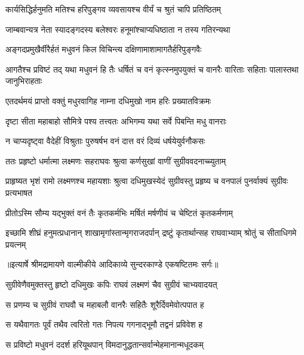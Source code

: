 \twolineshloka
{कार्यसिद्धिर्हनुमति मतिश्च हरिपुङ्गव}
{व्यवसायश्च वीर्यं च श्रुतं चापि प्रतिष्ठितम्} %

\twolineshloka
{जाम्बवान्यत्र नेता स्यादङ्गदस्य बलेश्वरः}
{हनूमांश्चाप्यधिष्ठाता न तस्य गतिरन्यथा} %

\twolineshloka
{अङ्गदप्रमुखैर्वीरैर्हतं मधुवनं किल}
{विचिन्त्य दक्षिणामाशामागतैर्हरिपुङ्गवैः} %

\threelineshloka
{आगतैश्च प्रविष्टं तद् यथा मधुवनं हि तैः}
{धर्षितं च वनं कृत्स्नमुपयुक्तं च वानरैः}
{वारिताः सहिताः पालास्तथा जानुभिराहताः} %

\twolineshloka
{एतदर्थमयं प्राप्तो वक्तुं मधुरवागिह}
{नाम्ना दधिमुखो नाम हरिः प्रख्यातविक्रमः} %

\twolineshloka
{दृष्टा सीता महाबाहो सौमित्रे पश्य तत्त्वतः}
{अभिगम्य यथा सर्वे पिबन्ति मधु वानराः} %

\twolineshloka
{न चाप्यदृष्ट्वा वैदेहीं विश्रुताः पुरुषर्षभ}
{वनं दात्त वरं दिव्यं धर्षयेयुर्वनौकसः} %

\twolineshloka
{ततः प्रहृष्टो धर्मात्मा लक्ष्मणः सहराघवः}
{श्रुत्वा कर्णसुखां वाणीं सुग्रीववदनाच्च्युताम्} %

\threelineshloka
{प्राहृष्यत भृशं रामो लक्ष्मणश्च महायशाः}
{श्रुत्वा दधिमुखस्येदं सुग्रीवस्तु प्रहृष्य च}
{वनपालं पुनर्वाक्यं सुग्रीवः प्रत्यभाषत} %

\twolineshloka
{प्रीतोऽस्मि सौम्य यद्भुक्तं वनं तैः कृतकर्मभिः}
{मर्षितं मर्षणीयं च चेष्टितं कृतकर्मणाम्} %

\fourlineindentedshloka
{इच्छामि शीघ्रं हनुमत्प्रधानान्}
{शाखामृगांस्तान्मृगराजदर्पान्}
{द्रष्टुं कृतार्थान्सह राघवाभ्याम्}
{श्रोतुं च सीताधिगमे प्रयत्नम्} %


{॥इत्यार्षे श्रीमद्रामायणे वाल्मीकीये आदिकाव्ये सुन्दरकाण्डे एकषष्टितमः सर्गः॥}


\twolineshloka
{सुग्रीवेणैवमुक्तस्तु हृष्टो दधिमुखः कपिः}
{राघवं लक्ष्मणं चैव सुग्रीवं चाभ्यवादयत्} %

\twolineshloka
{स प्रणम्य च सुग्रीवं राघवौ च महाबलौ}
{वानरैः सहितैः शूरैर्दिवमेवोत्पपात ह} %

\twolineshloka
{स यथैवागतः पूर्वं तथैव त्वरितो गतः}
{निपत्य गगनाद्भूमौ तद्वनं प्रविवेश ह} %

\twolineshloka
{स प्रविष्टो मधुवनं ददर्श हरियूथपान्}
{विमदानुद्धतान्सर्वान्मेहमानान्मधूदकम्} %

